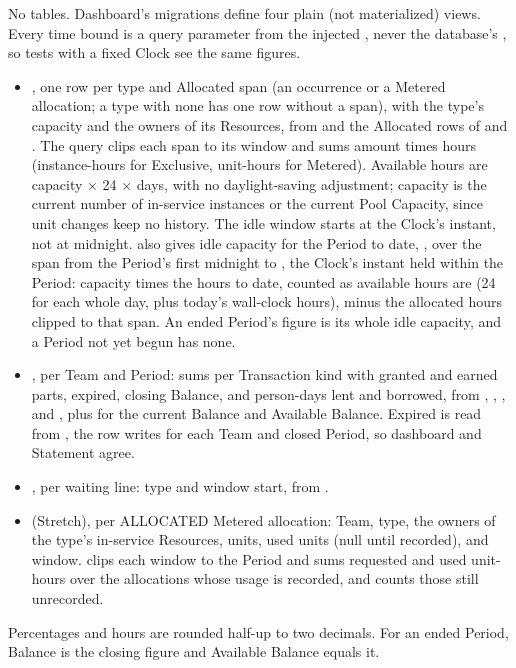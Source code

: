 No tables. Dashboard's migrations define four plain (not materialized) views. Every time bound is a query parameter from the injected , never the database's , so tests with a fixed Clock see the same figures.
\begin{itemize}
\item {}, one row per type and Allocated span (an occurrence or a Metered allocation; a type with none has one row without a span), with the type's capacity and the owners of its Resources, from  and the Allocated rows of  and . The query clips each span to its window and sums amount times hours (instance-hours for Exclusive, unit-hours for Metered). Available hours are capacity $\times$ 24 $\times$ days, with no daylight-saving adjustment; capacity is the current number of in-service instances or the current Pool Capacity, since unit changes keep no history. The idle window starts at the Clock's instant, not at midnight.  also gives idle capacity for the Period to date, , over the span from the Period's first midnight to , the Clock's instant held within the Period: capacity times the hours to date, counted as available hours are (24 for each whole day, plus today's wall-clock hours), minus the allocated hours clipped to that span. An ended Period's figure is its whole idle capacity, and a Period not yet begun has none.
\item {}, per Team and Period: sums per Transaction kind with granted and earned parts, expired, closing Balance, and person-days lent and borrowed, from , , , and , plus  for the current Balance and Available Balance. Expired is read from , the row  writes for each Team and closed Period, so dashboard and Statement agree.
\item {}, per waiting line: type and window start, from .
\item {} (Stretch), per ALLOCATED Metered allocation: Team, type, the owners of the type's in-service Resources, units, used units (null until recorded), and window.  clips each window to the Period and sums requested and used unit-hours over the allocations whose usage is recorded, and counts those still unrecorded.
\end{itemize}
Percentages and hours are rounded half-up to two decimals. For an ended Period, Balance is the closing figure and Available Balance equals it.

